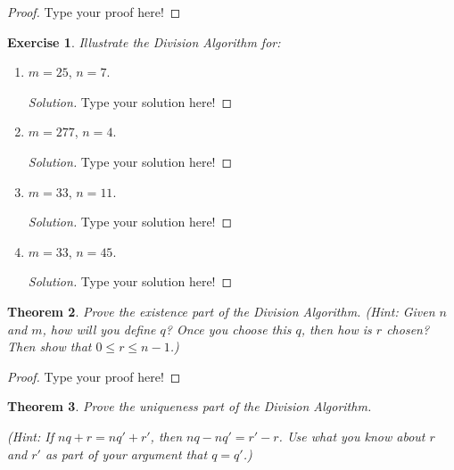 \documentclass[12pt,leqno]{article}
\numberwithin{equation}{section}
\newtheorem{thm}{Theorem}[section]
\newtheorem{exer}[thm]{Exercise}
\theoremstyle{definition}
\begin{document}
\begin{proof}[Proof]
Type your proof here!
\end{proof}

\setcounter{thm}{24}

\begin{exer} Illustrate the Division Algorithm for: \end{exer}
\begin{enumerate}
    \item[(1)] $m = 25$, $n = 7$.
    \begin{proof}[Solution]
    Type your solution here!
    \end{proof}

    \item[(2)] $m = 277$, $n = 4$.
    \begin{proof}[Solution]
    Type your solution here!
    \end{proof}

    \item[(3)] $m = 33$, $n = 11$.
    \begin{proof}[Solution]
    Type your solution here!
    \end{proof}

    \item[(4)] $m = 33$, $n = 45$.
    \begin{proof}[Solution]
    Type your solution here!
    \end{proof}

\end{enumerate}

\begin{thm}
Prove the existence part of the Division Algorithm. (\textit{Hint}:
Given $n$ and $m$, how will you define $q$?  Once you choose this
$q$, then how is $r$ chosen?  Then show that $0 \leq r \leq n-1$.)
\end{thm}

\begin{proof}[Proof]
Type your proof here!
\end{proof}

\begin{thm}
Prove the uniqueness part of the Division Algorithm.

(\textit{Hint}: If $nq + r = nq' + r'$, then $nq -nq' = r' - r$. Use
what you know about $r$ and $r'$ as part of your argument that $q =
q'$.)
\end{thm}
\end{document}
